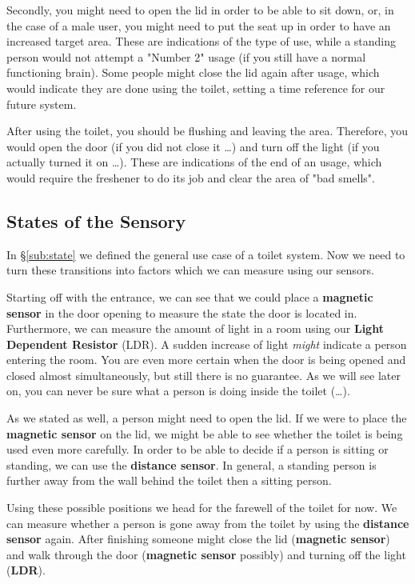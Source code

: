 \documentclass[a4paper, 12pt]{article}
\begin{document}
Secondly, you might need to open the lid in order to be able to sit down, or, in the case of a male user, you might need to put the seat up in order to have an increased target area. These are indications of the type of use, while a standing person would not attempt a "Number 2" usage (if you still have a normal functioning brain). Some people might close the lid again after usage, which would indicate they are done using the toilet, setting a time reference for our future system.

After using the toilet, you should be flushing and leaving the area. Therefore, you would open the door (if you did not close it \ldots) and turn off the light (if you actually turned it on \ldots). These are indications of the end of an usage, which would require the freshener to do its job and clear the area of "bad smells".

\subsection{States of the Sensory}
In \S\hyperref[sub:state]{\ref{sub:state}} we defined the general use case of a toilet system. Now we need to turn these transitions into factors which we can measure using our sensors. 

Starting off with the entrance, we can see that we could place a \textbf{magnetic sensor} in the door opening to measure the state the door is located in. Furthermore, we can measure the amount of light in a room using our \textbf{Light Dependent Resistor} (LDR). A sudden increase of light \emph{might} indicate a person entering the room. You are even more certain when the door is being opened and closed almost simultaneously, but still there is no guarantee. As we will see later on, you can never be sure what a person is doing inside the toilet (\ldots).

As we stated as well, a person might need to open the lid. If we were to place the \textbf{magnetic sensor} on the lid, we might be able to see whether the toilet is being used even more carefully. In order to be able to decide if a person is sitting or standing, we can use the \textbf{distance sensor}. In general, a standing person is further away from the wall behind the toilet then a sitting person.

Using these possible positions we head for the farewell of the toilet for now. We can measure whether a person is gone away from the toilet by using the \textbf{distance sensor} again. After finishing someone might close the lid (\textbf{magnetic sensor}) and walk through the door (\textbf{magnetic sensor} possibly) and turning off the light (\textbf{LDR}). 
\end{document}
